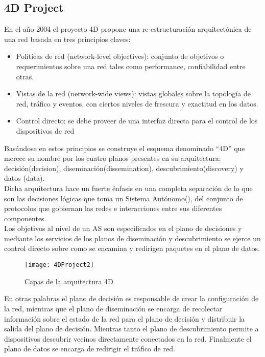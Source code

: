 \subsection{4D Project}
En el año 2004 el proyecto 4D \citep{rexford2004network}\citep{greenberg2005clean} propone una re-estructuración arquitectónica de una red basada en tres principios claves: 

\begin{itemize}
\item Políticas de red (network-level objectives): conjunto de objetivos o requerimientos sobre una red tales como performance, confiabilidad entre otras.

\item Vistas de la red (network-wide views): vistas globales sobre la topolog\'ia de red, tr\'afico y eventos, con ciertos niveles de frescura y exactitud en los datos.

\item Control directo: se debe proveer de una interfaz directa para el control de los dispositivos de red
\end{itemize}

Basándose en estos principios se construye el esquema denominado ``4D'' que merece su nombre por los cuatro planos presentes en su arquitectura: decisión(decision), diseminación(dissemination), descubrimiento(discovery) y datos (data).\\

Dicha arquitectura hace un fuerte énfasis en una completa separación de lo que son las decisiones lógicas que toma un Sistema Autónomo(), del conjunto de protocolos que gobiernan las redes e interacciones entre sus diferentes componentes.\\

Los objetivos al nivel de un AS son especificados en el plano de decisiones y mediante los servicios de los planos de diseminación y descubrimiento se ejerce un control directo sobre como se encamina y redirigen paquetes en el plano de datos.\\

\begin{figure}[htbp!] 
\centering    
\texttt{[image: 4DProject2]}
\caption[Capas de la arquitectura 4D]{Capas de la arquitectura 4D}
\label{fig:4DProject}
\end{figure}

En otras palabras el plano de decisión es responsable de crear la configuración de la red, mientras que el plano de diseminación se encarga de recolectar información sobre el estado de la red para el plano de decisión y distribuir la salida del plano de decisión. Mientras tanto el plano de descubrimiento permite a dispositivos descubrir vecinos directamente conectados en la red. Finalmente el plano de datos se encarga de redirigir el tráfico de red.\\ \\

